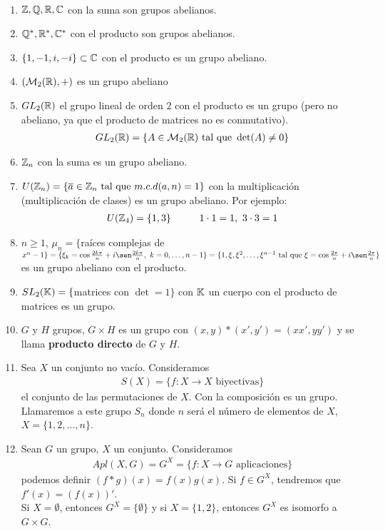 \begin{ejemplo}\
    \begin{enumerate}
        \item $\mathbb{Z}, \mathbb{Q}, \mathbb{R}, \mathbb{C}$ con la suma son grupos abelianos.
        \item $\mathbb{Q}^*, \mathbb{R}^*, \mathbb{C}^*$ con el producto son grupos abelianos.
        \item $\{1,-1,i,-i\}\subset \mathbb{C}$ con el producto es un grupo abeliano.
        \item $(\mathcal{M}_2(\mathbb{R}), +)$ es un grupo abeliano
        \item $GL_2(\mathbb{R})$ el grupo lineal de orden $2$ con el producto es un grupo (pero no abeliano, ya que el producto de matrices no es conmutativo).
        \begin{align*}
            GL_2(\mathbb{R}) = \{A\in \mathcal{M}_2(\mathbb{R}) \text{ tal que }\det(A)\neq 0\}
        \end{align*}
        \item $\mathbb{Z}_n$ con la suma es un grupo abeliano.
        \item $U(\mathbb{Z}_n)=\{\overline{a}\in \mathbb{Z}_n \text{ tal que } m.c.d(a,n)=1\}$ con la multiplicación (multiplicación de clases) es un grupo abeliano. Por ejemplo:        
        \begin{align*}
            U(\mathbb{Z}_4) = \{1,3\} \hspace*{1cm} 1\cdot 1 = 1 ,\ 3\cdot 3 = 1
        \end{align*}
        \item $n\geq 1$, $\mu_n=\{$raíces complejas de $x^n-1\} = \{\xi_k = \cos \frac{2k \pi}{n} + i \sen \frac{2k \pi}{n},\ k=0,\dots,n-1\}=\{1, \xi, \xi^2, \dots, \xi^{n-1}\text{ tal que } \xi=\cos \frac{2 \pi}{n} + i \sen \frac{2 \pi}{n}\}$ es un grupo abeliano con el producto.
        \item $SL_2(\mathbb{K})=\{$matrices con $\det=1\}$ con $\mathbb{K}$ un cuerpo con el producto de matrices es un grupo.
        \item $G$ y $H$ grupos, $G\times H$ es un grupo con $(x,y)\ast(x',y')=(xx',yy')$ y se llama \textbf{producto directo} de $G$ y $H$.
        \item Sea $X$ un conjunto no vacío. Consideramos 
        \begin{align*}
            S(X)=\{f:X\to X \text{ biyectivas}\}
        \end{align*}
        el conjunto de las permutaciones de $X$. Con la composición es un grupo. Llamaremos a este grupo $S_n$ donde $n$ será el número de elementos de $X$, $X=\{1,2,\dots,n\}$.
        \item Sean $G$ un grupo, $X$ un conjunto. Consideramos
        \begin{align*}
            Apl(X,G) = G^X = \{f:X \to G \text{ aplicaciones}\}
        \end{align*}
        podemos definir $(f\ast g)(x) = f(x)g(x)$. Si $f\in G^X$, tendremos que $f'(x)=(f(x))'$.\\

        Si $X=\emptyset$, entonces $G^X=\{\emptyset\}$ y si $X=\{1,2\}$, entonces $G^X$ es isomorfo a $G\times G$.
    \end{enumerate}
\end{ejemplo}

